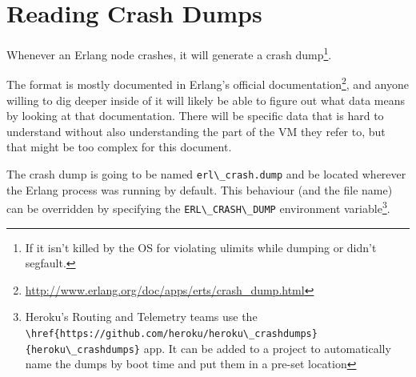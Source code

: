 \documentclass[11pt, oneside]{book}   	%
\newcommand{\filename}[1]{\Verb`#1`}
\newcommand{\otpapp}[1]{\Verb`#1`}
\newcommand{\command}[1]{\Verb`#1`}
\begin{document}


\chapter{Reading Crash Dumps}
\label{chap:crash-dumps}

Whenever an Erlang node crashes, it will generate a crash dump\footnote{If it isn't killed by the OS for violating ulimits while dumping or didn't segfault.}.

The format is mostly documented in Erlang's official documentation\footnote{\href{http://www.erlang.org/doc/apps/erts/crash\_dump.html}{http://www.erlang.org/doc/apps/erts/crash\_dump.html}}, and anyone willing to dig deeper inside of it will likely be able to figure out what data means by looking at that documentation. There will be specific data that is hard to understand without also understanding the part of the VM they refer to, but that might be too complex for this document.

The crash dump is going to be named \filename{erl\_crash.dump} and be located wherever the Erlang process was running by default. This behaviour (and the file name) can be overridden by specifying the \command{ERL\_CRASH\_DUMP} environment variable\footnote{Heroku's Routing and Telemetry teams use the \otpapp{\href{https://github.com/heroku/heroku\_crashdumps}{heroku\_crashdumps}} app. It can be added to a project to automatically name the dumps by boot time and put them in a pre-set location}.
\end{document}
